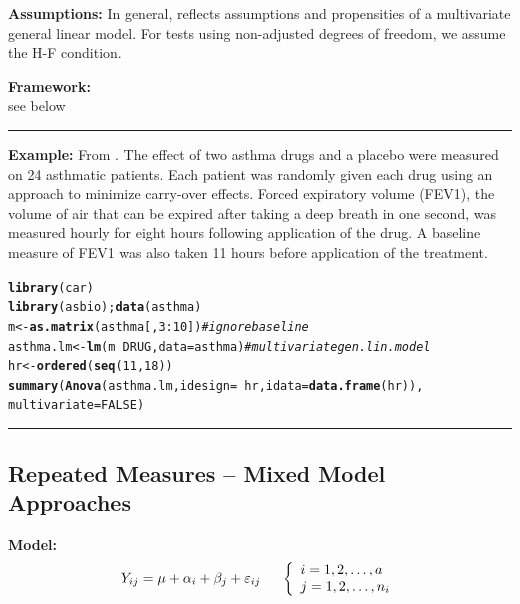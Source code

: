 \documentclass[12pt,english]{article}\usepackage[]{graphicx}\usepackage[table]{xcolor}
\makeatletter
\newcommand{\hlnum}[1]{\textcolor[rgb]{0.686,0.059,0.569}{#1}}%
\newcommand{\hlcom}[1]{\textcolor[rgb]{0.678,0.584,0.686}{\textit{#1}}}%
\newcommand{\hlopt}[1]{\textcolor[rgb]{0,0,0}{#1}}%
\newcommand{\hldef}[1]{\textcolor[rgb]{0.345,0.345,0.345}{#1}}%
\newcommand{\hlkwb}[1]{\textcolor[rgb]{0.69,0.353,0.396}{#1}}%
\newcommand{\hlkwc}[1]{\textcolor[rgb]{0.333,0.667,0.333}{#1}}%
\newcommand{\hlkwd}[1]{\textcolor[rgb]{0.737,0.353,0.396}{\textbf{#1}}}%
\newenvironment{kframe}{%
 \def\at@end@of@kframe{}%
 \ifinner\ifhmode%
  \def\at@end@of@kframe{\end{minipage}}%
  \begin{minipage}{\columnwidth}%
 \fi\fi%
 \def\FrameCommand##1{\hskip\@totalleftmargin \hskip-\fboxsep
 \colorbox{shadecolor}{##1}\hskip-\fboxsep
     \hskip-\linewidth \hskip-\@totalleftmargin \hskip\columnwidth}%
 \MakeFramed {\advance\hsize-\width
   \@totalleftmargin\z@ \linewidth\hsize
   \@setminipage}}%
 {\par\unskip\endMakeFramed%
 \at@end@of@kframe}
\newenvironment{knitrout}{}{} %
\makeatother
\begin{document}
\noindent \textbf{Assumptions:} In general, reflects assumptions and propensities of a multivariate general linear model.  For tests using non-adjusted degrees of freedom, we assume the H-F condition.
\vspace{0.1in}

\begin{tcolorbox}[colback=yellow!50!red!25!white,colbacktitle=yellow!50!red,colframe=black!75!white,title=\textbf{R:} Repeated Measures ANOVA]

\textbf{Framework:}\\
see below
\vspace{0.1in}
\par\noindent\rule{.9\textwidth}{0.4pt}

\textbf{Example:} From \citep[][pg 265]{litt2002}. The effect of two asthma drugs and a placebo were measured on 24 asthmatic patients. Each patient was randomly given each drug using an approach to minimize carry-over effects. Forced expiratory volume (FEV1), the volume of air that can be expired after taking a deep breath in one second, was measured hourly for eight hours following application of the drug. A baseline measure of FEV1 was also taken 11 hours before application of the treatment.
\vspace{-.1in}
\begin{knitrout}
\color{fgcolor}\begin{kframe}
\begin{alltt}
\hlkwd{library}\hldef{(car)}
\hlkwd{library}\hldef{(asbio);} \hlkwd{data}\hldef{(asthma)}
\hldef{m} \hlkwb{<-} \hlkwd{as.matrix}\hldef{(asthma[,}\hlnum{3}\hlopt{:}\hlnum{10}\hldef{])} \hlcom{# ignore baseline}
\hldef{asthma.lm} \hlkwb{<-} \hlkwd{lm}\hldef{(m} \hlopt{~} \hldef{DRUG,} \hlkwc{data} \hldef{= asthma)} \hlcom{# multivariate gen. lin. model}
\hldef{hr} \hlkwb{<-} \hlkwd{ordered}\hldef{(}\hlkwd{seq}\hldef{(}\hlnum{11}\hldef{,} \hlnum{18}\hldef{))}
\hlkwd{summary}\hldef{(}\hlkwd{Anova}\hldef{(asthma.lm,} \hlkwc{idesign} \hldef{=}\hlopt{~}\hldef{hr,} \hlkwc{idata} \hldef{=} \hlkwd{data.frame}\hldef{(hr)),}
        \hlkwc{multivariate} \hldef{=} \hlnum{FALSE}\hldef{)}
\end{alltt}
\end{kframe}
\end{knitrout}
\end{tcolorbox}
\par\noindent\rule{.9\textwidth}{0.4pt}

\subsection{Repeated Measures -- Mixed Model Approaches}
\noindent \textbf{Model:} \[Y_{ij} = \mu + \alpha_i + \beta_j + \varepsilon_{ij} \hspace{0.2in} \left\{
\begin{array}{ll}
                  i = 1,2,\dots,a\\
                  j = 1,2,\dots,n_i\\
                  \end{array}
              \right.\]
\end{document}
